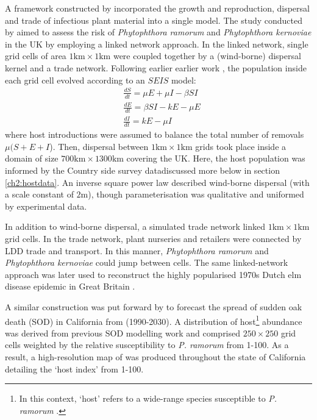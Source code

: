 A framework constructed by \cite{harwood2009epidemiological} incorporated the growth and reproduction, dispersal and trade
of infectious plant material into a single model. The study conducted by \cite{harwood2009epidemiological} aimed
to assess the risk of \textit{Phytophthora ramorum} and \textit{Phytophthora kernoviae} in the UK by
employing a linked network approach. 
In the linked network, single grid cells of area $\mathrm{1km \times 1km}$ were coupled together by a (wind-borne)
dispersal kernel and a trade network. 
Following earlier earlier work \cite{madden2007study}, the population inside each grid cell evolved according
to an $SEIS$ model:
\begin{align}
    \label{eq:phyt-model1}
    &\frac{dS}{dt} = \mu E + \mu I - \beta S I\\
    &\frac{dE}{dt} =  \beta S I - k E - \mu E   \\
    \label{eq:phyt-model3}
    &\frac{dI}{dt} = k E - \mu I
\end{align}
where host introductions were assumed to balance the total number of removals $\mu (S + E + I$).
Then, dispersal between $\mathrm{1km \times 1km}$ grids took place inside a domain of size $\mathrm{700km \times 1300km}$ 
covering the UK. Here, the host population was informed by the Country side survey data\textemdash discussed more 
below in section \ref{ch2:hostdata}. An inverse square power law described wind-borne dispersal (with a scale constant
of $2\mathrm{m}$), though parameterisation was qualitative and uniformed by experimental data.

In addition to wind-borne dispersal, a simulated trade network linked $\mathrm{1km \times 1km}$ grid cells. 
In the trade network, plant nurseries and retailers were connected by LDD trade and transport. 
In this manner, \textit{Phytophthora ramorum} and \textit{Phytophthora kernoviae} could jump 
between cells. The same linked-network approach was later used to reconstruct the highly 
popularised 1970s Dutch elm disease epidemic in Great Britain \cite{doi:10.1111/j.1365-3059.2010.02391.x, potter2011learning}.

A similar construction was put forward by \cite{meentemeyer2011epidemiological} to 
forecast the spread of sudden oak death (SOD) in California from (1990-2030).
A distribution of host\footnote{In this context, `host' refers to a wide-range
species susceptible to \textit{P. ramorum} \cite{tooley2004susceptibility}.
} abundance was derived from previous SOD modelling work 
\cite{meentemeyer2004mapping} and comprised $\mathrm{250 \times 250}$ grid cells
weighted by the relative susceptibility to \textit{P. ramorum} from 1-100. As a result,
a high-resolution map of was produced throughout the state of California detailing the `host index'
from 1-100.


